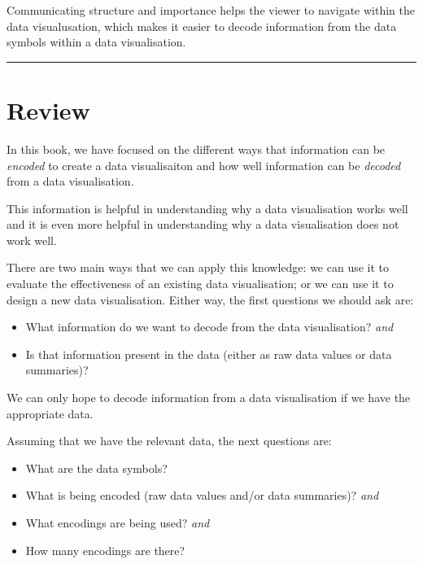 \documentclass[
  letterpaper,
  DIV=11,
  numbers=noendperiod]{scrreprt}
\providecommand{\tightlist}{%
  \setlength{\itemsep}{0pt}\setlength{\parskip}{0pt}}
\begin{document}
Communicating structure and importance helps the viewer to navigate
within the data visualusation, which makes it easier to decode
information from the data symbols within a data visualisation.

\begin{center}\rule{0.5\linewidth}{0.5pt}\end{center}

\theendnotes


\chapter{Review}\label{sec-review}

In this book, we have focused on the different ways that information can
be \emph{encoded} to create a data visualisaiton and how well
information can be \emph{decoded} from a data visualisation.

This information is helpful in understanding why a data visualisation
works well and it is even more helpful in understanding why a data
visualisation does not work well.

There are two main ways that we can apply this knowledge: we can use it
to evaluate the effectiveness of an existing data visualisation; or we
can use it to design a new data visualisation. Either way, the first
questions we should ask are:

\begin{itemize}
\tightlist
\item
  What information do we want to decode from the data visualisation?
  \emph{and}
\item
  Is that information present in the data (either as raw data values or
  data summaries)?
\end{itemize}

We can only hope to decode information from a data visualisation if we
have the appropriate data.

Assuming that we have the relevant data, the next questions are:

\begin{itemize}
\tightlist
\item
  What are the data symbols?
\end{itemize}

\begin{itemize}
\tightlist
\item
  What is being encoded (raw data values and/or data summaries)?
  \emph{and}
\item
  What encodings are being used? \emph{and}
\item
  How many encodings are there?
\end{itemize}
\end{document}
